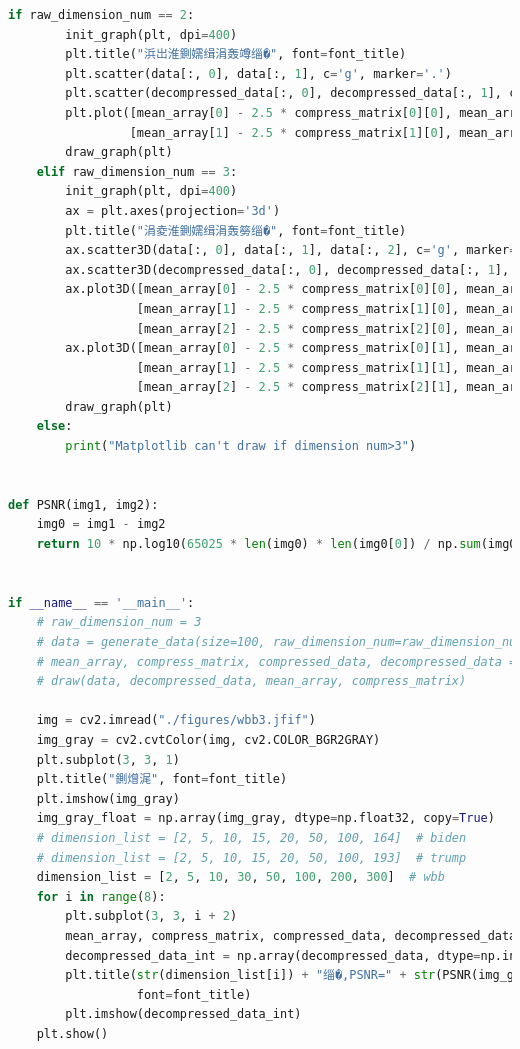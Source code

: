 \documentclass[withoutpreface,bwprint]{cumcmthesis}
\begin{document}
\begin{appendix}
\begin{lstlisting}[language=python]
    if raw_dimension_num == 2:
        init_graph(plt, dpi=400)
        plt.title("浜岀淮鍘嬬缉涓轰竴缁�", font=font_title)
        plt.scatter(data[:, 0], data[:, 1], c='g', marker='.')
        plt.scatter(decompressed_data[:, 0], decompressed_data[:, 1], c='r', marker='.')
        plt.plot([mean_array[0] - 2.5 * compress_matrix[0][0], mean_array[0] + 2.5 * compress_matrix[0][0]],
                 [mean_array[1] - 2.5 * compress_matrix[1][0], mean_array[1] + 2.5 * compress_matrix[1][0]], linewidth=1)
        draw_graph(plt)
    elif raw_dimension_num == 3:
        init_graph(plt, dpi=400)
        ax = plt.axes(projection='3d')
        plt.title("涓夌淮鍘嬬缉涓轰簩缁�", font=font_title)
        ax.scatter3D(data[:, 0], data[:, 1], data[:, 2], c='g', marker='.')
        ax.scatter3D(decompressed_data[:, 0], decompressed_data[:, 1], decompressed_data[:, 2], c='r', marker='.')
        ax.plot3D([mean_array[0] - 2.5 * compress_matrix[0][0], mean_array[0] + 2.5 * compress_matrix[0][0]],
                  [mean_array[1] - 2.5 * compress_matrix[1][0], mean_array[1] + 2.5 * compress_matrix[1][0]],
                  [mean_array[2] - 2.5 * compress_matrix[2][0], mean_array[2] + 2.5 * compress_matrix[2][0]], linewidth=1)
        ax.plot3D([mean_array[0] - 2.5 * compress_matrix[0][1], mean_array[0] + 2.5 * compress_matrix[0][1]],
                  [mean_array[1] - 2.5 * compress_matrix[1][1], mean_array[1] + 2.5 * compress_matrix[1][1]],
                  [mean_array[2] - 2.5 * compress_matrix[2][1], mean_array[2] + 2.5 * compress_matrix[2][1]], linewidth=1)
        draw_graph(plt)
    else:
        print("Matplotlib can't draw if dimension num>3")


def PSNR(img1, img2):
    img0 = img1 - img2
    return 10 * np.log10(65025 * len(img0) * len(img0[0]) / np.sum(img0 ** 2))


if __name__ == '__main__':
    # raw_dimension_num = 3
    # data = generate_data(size=100, raw_dimension_num=raw_dimension_num)
    # mean_array, compress_matrix, compressed_data, decompressed_data = PCA(copy.deepcopy(data), raw_dimension_num - 1)
    # draw(data, decompressed_data, mean_array, compress_matrix)

    img = cv2.imread("./figures/wbb3.jfif")
    img_gray = cv2.cvtColor(img, cv2.COLOR_BGR2GRAY)
    plt.subplot(3, 3, 1)
    plt.title("鍘熷浘", font=font_title)
    plt.imshow(img_gray)
    img_gray_float = np.array(img_gray, dtype=np.float32, copy=True)
    # dimension_list = [2, 5, 10, 15, 20, 50, 100, 164]  # biden
    # dimension_list = [2, 5, 10, 15, 20, 50, 100, 193]  # trump
    dimension_list = [2, 5, 10, 30, 50, 100, 200, 300]  # wbb
    for i in range(8):
        plt.subplot(3, 3, i + 2)
        mean_array, compress_matrix, compressed_data, decompressed_data = PCA(img_gray_float, dimension_list[i])
        decompressed_data_int = np.array(decompressed_data, dtype=np.int32, copy=True)
        plt.title(str(dimension_list[i]) + "缁�,PSNR=" + str(PSNR(img_gray_float, np.array(decompressed_data, dtype=np.float32, copy=True))),
                  font=font_title)
        plt.imshow(decompressed_data_int)
    plt.show()
\end{lstlisting}

\end{appendix}
\end{document}
